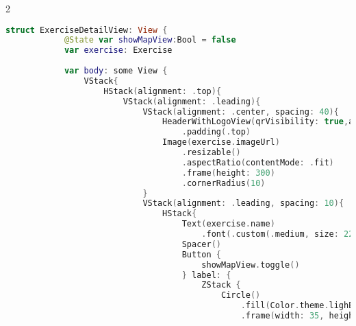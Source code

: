 \begin{spacing}{2}
\end{spacing}
\begin{minipage}{\textwidth}
    \linespread{0.8}\selectfont
    \begin{lstlisting}[language=swift]
        struct ExerciseDetailView: View {
            @State var showMapView:Bool = false
            var exercise: Exercise
            
            var body: some View {
                VStack{
                    HStack(alignment: .top){
                        VStack(alignment: .leading){
                            VStack(alignment: .center, spacing: 40){
                                HeaderWithLogoView(qrVisibility: true,arrowVisibility:true, navigationPage: .traningPage)
                                    .padding(.top)
                                Image(exercise.imageUrl)
                                    .resizable()
                                    .aspectRatio(contentMode: .fit)
                                    .frame(height: 300)
                                    .cornerRadius(10)
                            }
                            VStack(alignment: .leading, spacing: 10){
                                HStack{
                                    Text(exercise.name)
                                        .font(.custom(.medium, size: 22))
                                    Spacer()
                                    Button {
                                        showMapView.toggle()
                                    } label: {
                                        ZStack {
                                            Circle()
                                                .fill(Color.theme.lighBlue)
                                                .frame(width: 35, height: 35)
                                            

\end{lstlisting}
\end{minipage}
